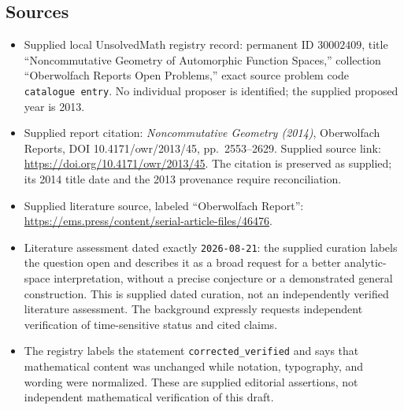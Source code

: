 \documentclass[11pt]{article}
\begin{document}
\subsection{Sources}
\begin{itemize}
\item Supplied local UnsolvedMath registry record: permanent ID \(30002409\), title ``Noncommutative Geometry of Automorphic Function Spaces,'' collection ``Oberwolfach Reports Open Problems,'' exact source problem code \texttt{catalogue entry}. No individual proposer is identified; the supplied proposed year is 2013.
\item Supplied report citation: \emph{Noncommutative Geometry (2014)}, Oberwolfach Reports, DOI 10.4171/owr/2013/45, pp.\ 2553--2629. Supplied source link: \url{https://doi.org/10.4171/owr/2013/45}. The citation is preserved as supplied; its 2014 title date and the 2013 provenance require reconciliation.
\item Supplied literature source, labeled ``Oberwolfach Report'': \url{https://ems.press/content/serial-article-files/46476}.
\item Literature assessment dated exactly \texttt{2026-08-21}: the supplied curation labels the question open and describes it as a broad request for a better analytic-space interpretation, without a precise conjecture or a demonstrated general construction. This is supplied dated curation, not an independently verified literature assessment. The background expressly requests independent verification of time-sensitive status and cited claims.
\item The registry labels the statement \texttt{corrected\_verified} and says that mathematical content was unchanged while notation, typography, and wording were normalized. These are supplied editorial assertions, not independent mathematical verification of this draft.
\end{itemize}
\end{document}
